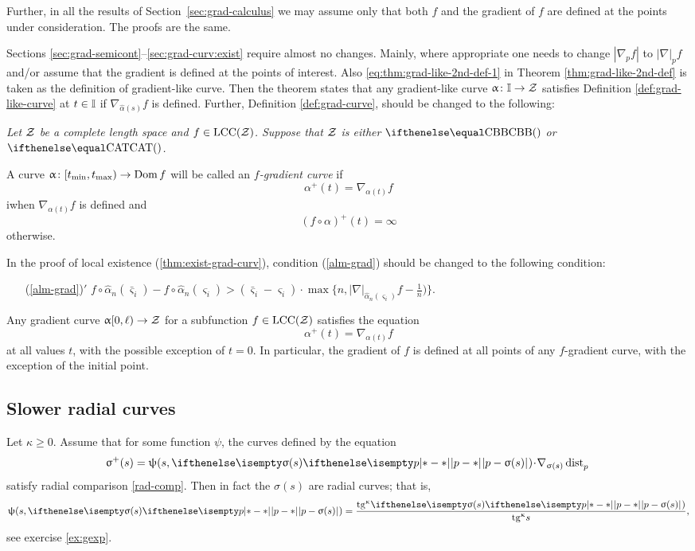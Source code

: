 \medskip

Further, in all the results of Section~\ref{sec:grad-calculus} 
we may assume only that both $f$ and the gradient of $f$ are defined at the points under consideration. The proofs are the same.

Sections \ref{sec:grad-semicont}--\ref{sec:grad-curv:exist}
require almost no changes.
Mainly, where appropriate
one needs to change $|\nabla_p f|$ 
to $|\nabla|_pf$ 
and/or assume that the gradient is defined at the points of interest.
Also  \ref{eq:thm:grad-like-2nd-def-1} in Theorem \ref{thm:grad-like-2nd-def}
is taken as the definition of gradient-like curve.
Then the theorem states that any  gradient-like curve $\alpha\:\II\to\spc{Z}$ satisfies Definition \ref{def:grad-like-curve} at $t\in \II$ if $\nabla_{\hat\alpha(s)} f$ is defined.
Further, Definition \ref{def:grad-curve}, should be changed to the following:

\medskip

{\it Let $\mathcal{Z}$ be a complete length space
and $f\in\LSCSC(\spc{Z})$.
Suppose that $\mathcal{Z}$ is either $\Alex{}$ or $\CAT{}$.

A curve 
$\alpha\:[t_{\min},t_{\max})\to\Dom f$ will be called an  \emph{$f$-gradient curve} if
\[\alpha^+(t)=\nabla_{\alpha(t)} f\]
iwhen $\nabla_{\alpha(t)} f$ is defined and 
\[(f\circ\alpha)^+(t)=\infty\]
otherwise.}

\medskip

In the proof of local existence (\ref{thm:exist-grad-curv}), condition (\ref{alm-grad})
should be changed to the following condition:
\begin{itemize}

\item[{(\ref{alm-grad})}$'$]
$f\circ\hat\alpha_n(\bar\varsigma_i)-f\circ\hat\alpha_n(\varsigma_i)
>
(\bar\varsigma_i-\varsigma_i)
\cdot
\max\{n,|\nabla|_{\hat\alpha_n(\varsigma_i)}f-\tfrac{1}{n})\}.$
\end{itemize}

Any gradient curve $\alpha[0,\ell)\to\spc{Z}$
for a subfunction
$f\in \LSCSC(\spc{Z})$
satisfies the equation
\[\alpha^+(t)=\nabla_{\alpha(t)} f\]
at all values $t$, with the possible exception of $t=0$.
In particular, the gradient of $f$ is defined at all points of any 
$f$-gradient curve, with the exception of the initial point.

\subsection*{Slower radial curves}
Let $\kappa\ge 0$. 
Assume that for some function $\psi$, the curves defined by the equation 
\[\sigma^+(s)=\psi(s,\dist{p}{\sigma(s)}{})\cdot\nabla_{\sigma(s)}\distfun{p}{}{}\]
satisfy radial comparison \ref{rad-comp}.
Then in fact the $\sigma(s)$ are radial curves; 
that is, 
\[\psi(s,\dist{p}{\sigma(s)}{})= \frac{\tg\kappa\dist[{{}}]{p}{\sigma(s)}{})}{\tg\kappa s},\]
see exercise \ref{ex:gexp}.

